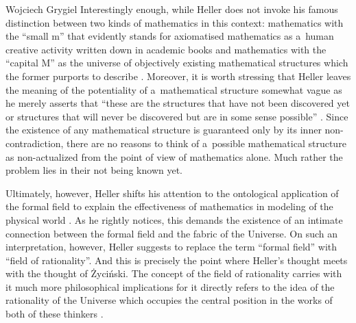 \begin{artengenv}{Wojciech Grygiel}
Interestingly enough, while Heller does not invoke his famous distinction between two kinds of mathematics in this context: mathematics with the ``small m'' that evidently stands for axiomatised mathematics as a~human creative activity written down in academic books and mathematics with the ``capital M'' as the universe of objectively existing mathematical structures which the former purports to describe
\parencite[e.g.][]{heller_co_2010}. %
 Moreover, it is worth stressing that Heller leaves the meaning of the potentiality of a~mathematical structure somewhat vague as he merely asserts that ``these are the structures that have not been discovered yet or structures that will never be discovered but are in some sense possible'' 
\parencite[][pp.236–237]{heller_uchwycic_1997}. %
 Since the existence of any mathematical structure is guaranteed only by its inner non-contradiction, there are no reasons to think of a~possible mathematical structure as non-actualized from the point of view of mathematics alone. Much rather the problem lies in their not being known yet.

Ultimately, however, Heller shifts his attention to the ontological application of the formal field to explain the effectiveness of mathematics in modeling of the physical world
\parencite[][p.237]{heller_uchwycic_1997}. %
 As he rightly notices, this demands the existence of an intimate connection between the formal field and the fabric of the Universe. On such an interpretation, however, Heller suggests to replace the term ``formal field'' with ``field of rationality''. And this is precisely the point where Heller's thought meets with the thought of Życiński. The concept of the field of rationality carries with it much more philosophical implications for it directly refers to the idea of the rationality of the Universe which occupies the central position in the works of both of these thinkers 
\parencites[e.g.][]{heller_czy_2006}[][]{zycinski_granice_2013}.%



\end{artengenv}
